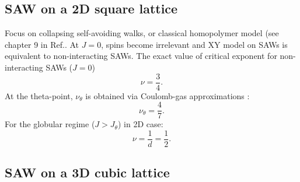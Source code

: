 \subsection{SAW on a 2D square lattice }
Focus on collapsing self-avoiding walks, or classical homopolymer model (see chapter 9 in Ref.\cite{van2015statistical}. At $J=0$, spins become irrelevant and XY model on SAWs  is equivalent to non-interacting SAWs.  The exact value of critical  exponent for non-interacting SAWs ($J=0$)\cite{Li1995}
\begin{equation}
\label{nur}
\nu = \frac{3}{4}. 
\end{equation}
At the theta-point, $\nu_{\theta}$  is obtained via Coulomb-gas approximations \cite{Duplantier1987}:
\begin{equation}
\label{nu_theta}
\nu_{\theta} = \frac{4}{7}.
\end{equation}  
For the globular regime ($J > J_{\theta}$) in 2D case:
\begin{equation}
\label{globular}
\nu = \frac{1}{d} = \frac{1}{2}.
\end{equation} 

\subsection{SAW on a 3D cubic lattice }

